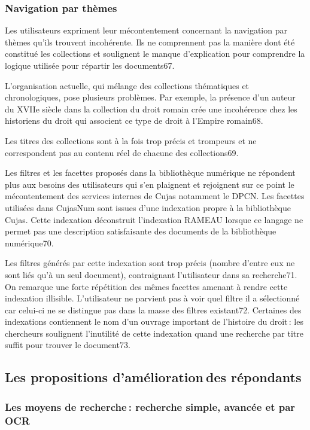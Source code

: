 \subsubsection{Navigation par thèmes}  

Les utilisateurs expriment leur mécontentement concernant la navigation par thèmes qu’ils trouvent incohérente. Ils ne comprennent pas la manière dont été constitué les collections et soulignent le manque d’explication pour comprendre la logique utilisée pour répartir les documents67. 

L’organisation actuelle, qui mélange des collections thématiques et chronologiques, pose plusieurs problèmes. Par exemple, la présence d’un auteur du XVIIe siècle dans la collection du droit romain crée une incohérence chez les historiens du droit qui associent ce type de droit à l’Empire romain68. 

Les titres des collections sont à la fois trop précis et trompeurs et ne correspondent pas au contenu réel de chacune des collections69.  

Les filtres et les facettes proposés dans la bibliothèque numérique ne répondent plus aux besoins des utilisateurs qui s’en plaignent et rejoignent sur ce point le mécontentement des services internes de Cujas notamment le DPCN. Les facettes utilisées dans CujasNum sont issues d’une indexation propre à la bibliothèque Cujas. Cette indexation déconstruit l’indexation RAMEAU lorsque ce langage ne permet pas une description satisfaisante des documents de la bibliothèque numérique70. 

Les filtres générés par cette indexation sont trop précis (nombre d’entre eux ne sont liés qu’à un seul document), contraignant l’utilisateur dans sa recherche71. On remarque une forte répétition des mêmes facettes amenant à rendre cette indexation illisible. L’utilisateur ne parvient pas à voir quel filtre il a sélectionné car celui-ci ne se distingue pas dans la masse des filtres existant72. Certaines des indexations contiennent le nom d’un ouvrage important de l’histoire du droit : les chercheurs soulignent l’inutilité de cette indexation quand une recherche par titre suffit pour trouver le document73.  

\subsection{Les propositions d’amélioration des répondants}

\subsubsection{Les moyens de recherche : recherche simple, avancée et par OCR}

